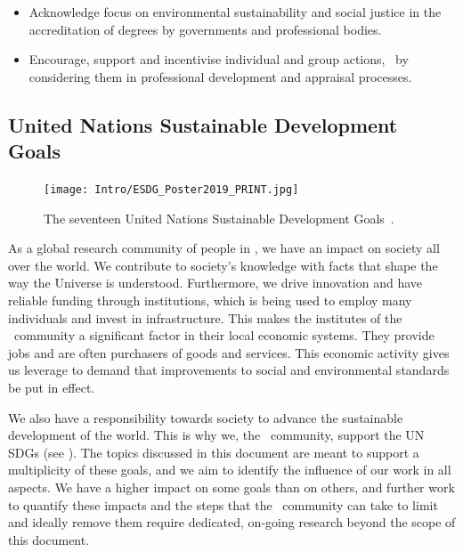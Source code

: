 \documentclass[../SustainableHEP.tex]{subfiles}
\begin{document}
\begin{minipage}{\textwidth}
\begin{reco2}{\currentname}
{\begin{itemize}[leftmargin=6 mm]
\item Acknowledge focus on environmental sustainability and social justice in the accreditation of degrees by governments and professional bodies.

\item Encourage, support and incentivise individual and group actions, \eg\ by considering them in professional development and appraisal processes.
\end{itemize}
}

\end{reco2}
\end{minipage}


\newpage
\subsection{United Nations Sustainable Development Goals}


\begin{figure}[!ht]
     \centering
     \texttt{[image: Intro/ESDG\_Poster2019\_PRINT.jpg]}
     \caption[United Nations Sustainable Development Goals]{The seventeen United Nations Sustainable Development Goals~\cite{UNSustainableGoalsFigure}.\label{fig:17_UN_SustGoals}}
\end{figure}


As a global research community of people in \ACR, we have an impact on society all over the world.
We contribute to society's knowledge with facts that shape the way the Universe is understood. Furthermore, we drive innovation and have reliable funding through institutions, which is being used to employ many individuals and invest in infrastructure.
This makes the institutes of the \ACR\ community a significant factor in their local economic systems.
They provide jobs and are often purchasers of goods and services.
This economic activity gives us leverage to demand that improvements to social and environmental standards be put in effect.

We also have a responsibility towards society to advance the sustainable development of the world.
This is why we, the \ACR\  community, support the UN SDGs (see ). 
The topics discussed in this document are meant to support a multiplicity of these goals, and we aim to identify the influence of our work in all aspects. We have a higher impact on some goals than on others, and further work to quantify these impacts and the steps that the \ACR\ community can take to limit and ideally remove them require dedicated, on-going research beyond the scope of this document.
\end{document}
